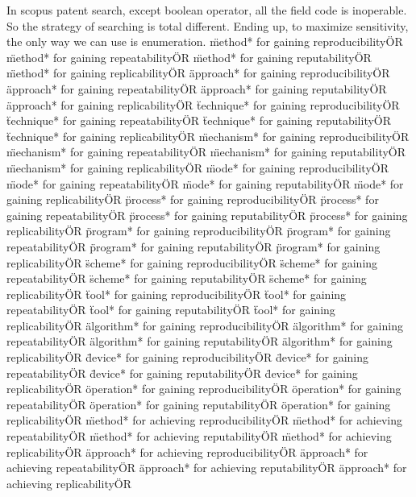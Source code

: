 \documentclass[
10pt, %
a4paper, %
oneside, %
headinclude,footinclude, %
BCOR5mm, %
]{scrartcl}
\begin{document}
In scopus patent search, except boolean operator, all the field code is inoperable. So the strategy of searching is total different. Ending up, to maximize sensitivity, the only way we can use is enumeration.
\"method* for gaining reproducibility\" OR \"method* for gaining repeatability\" OR \"method* for gaining reputability\" OR \"method* for gaining replicability\" OR 
\"approach* for gaining reproducibility\" OR \"approach* for gaining repeatability\" OR \"approach* for gaining reputability\" OR \"approach* for gaining replicability\" OR 
\"technique* for gaining reproducibility\" OR \"technique* for gaining repeatability\" OR \"technique* for gaining reputability\" OR \"technique* for gaining replicability\" OR 
\"mechanism* for gaining reproducibility\" OR \"mechanism* for gaining repeatability\" OR \"mechanism* for gaining reputability\" OR \"mechanism* for gaining replicability\" OR 
\"mode* for gaining reproducibility\" OR \"mode* for gaining repeatability\" OR \"mode* for gaining reputability\" OR \"mode* for gaining replicability\" OR 
\"process* for gaining reproducibility\" OR \"process* for gaining repeatability\" OR \"process* for gaining reputability\" OR \"process* for gaining replicability\" OR 
\"program* for gaining reproducibility\" OR \"program* for gaining repeatability\" OR \"program* for gaining reputability\" OR \"program* for gaining replicability\" OR 
\"scheme* for gaining reproducibility\" OR \"scheme* for gaining repeatability\" OR \"scheme* for gaining reputability\" OR \"scheme* for gaining replicability\" OR 
\"tool* for gaining reproducibility\" OR \"tool* for gaining repeatability\" OR \"tool* for gaining reputability\" OR \"tool* for gaining replicability\" OR 
\"algorithm* for gaining reproducibility\" OR \"algorithm* for gaining repeatability\" OR \"algorithm* for gaining reputability\" OR \"algorithm* for gaining replicability\" OR 
\"device* for gaining reproducibility\" OR \"device* for gaining repeatability\" OR \"device* for gaining reputability\" OR \"device* for gaining replicability\" OR 
\"operation* for gaining reproducibility\" OR \"operation* for gaining repeatability\" OR \"operation* for gaining reputability\" OR \"operation* for gaining replicability\" OR 
\"method* for achieving reproducibility\" OR \"method* for achieving repeatability\" OR \"method* for achieving reputability\" OR \"method* for achieving replicability\" OR 
\"approach* for achieving reproducibility\" OR \"approach* for achieving repeatability\" OR \"approach* for achieving reputability\" OR \"approach* for achieving replicability\" OR 
\end{document}
